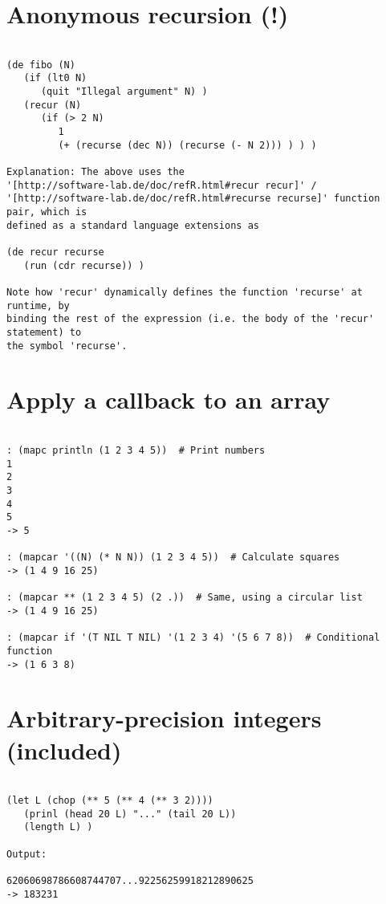 \section*{Anonymous recursion (!)}

\begin{verbatim}

(de fibo (N)
   (if (lt0 N)
      (quit "Illegal argument" N) )
   (recur (N)
      (if (> 2 N)
         1
         (+ (recurse (dec N)) (recurse (- N 2))) ) ) )

Explanation: The above uses the
'[http://software-lab.de/doc/refR.html#recur recur]' /
'[http://software-lab.de/doc/refR.html#recurse recurse]' function pair, which is
defined as a standard language extensions as

(de recur recurse
   (run (cdr recurse)) )

Note how 'recur' dynamically defines the function 'recurse' at runtime, by
binding the rest of the expression (i.e. the body of the 'recur' statement) to
the symbol 'recurse'.

\end{verbatim}

\section*{Apply a callback to an array}

\begin{verbatim}

: (mapc println (1 2 3 4 5))  # Print numbers
1
2
3
4
5
-> 5

: (mapcar '((N) (* N N)) (1 2 3 4 5))  # Calculate squares
-> (1 4 9 16 25)

: (mapcar ** (1 2 3 4 5) (2 .))  # Same, using a circular list
-> (1 4 9 16 25)

: (mapcar if '(T NIL T NIL) '(1 2 3 4) '(5 6 7 8))  # Conditional function
-> (1 6 3 8)

\end{verbatim}

\section*{Arbitrary-precision integers (included)}

\begin{verbatim}

(let L (chop (** 5 (** 4 (** 3 2))))
   (prinl (head 20 L) "..." (tail 20 L))
   (length L) )

Output:

62060698786608744707...92256259918212890625
-> 183231

\end{verbatim}

